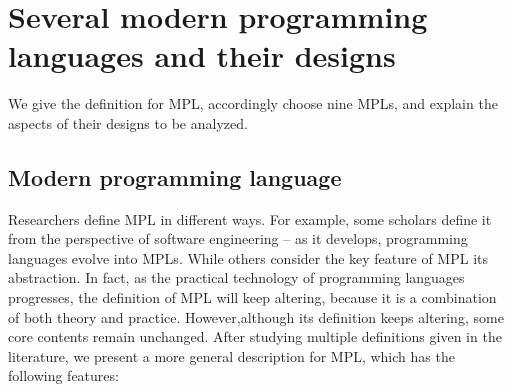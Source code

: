 \section{Several modern programming languages and their designs}

We give the definition for MPL, accordingly choose nine MPLs,
and explain the aspects of their designs to be analyzed.



\subsection{Modern programming language}

Researchers define MPL in different ways.
For example, some scholars define it from the perspective of software
engineering – as it develops, programming languages evolve into MPLs\cite{ModernProgrammingLanguagesSoftwareEnginerring}.
While others consider the key feature of MPL its abstraction\cite{ModernProgrammingLanguagesAbstraction}.
In fact, as the practical technology of programming languages progresses,
the definition of MPL will keep altering, because it is a combination
of both theory and practice.
However,although its definition keeps altering,
some core contents remain unchanged.
After studying multiple definitions given in the literature, we present a
more general description for MPL, which has the following features:


